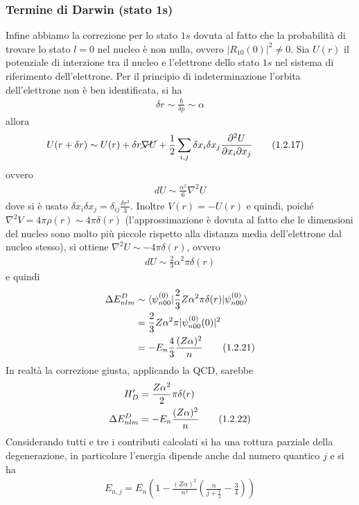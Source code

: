 \documentclass{article}
\begin{document}
\subsubsection*{Termine di Darwin (stato 1s)}
Infine abbiamo la correzione per lo stato $1s$ dovuta al fatto che la probabilità di trovare lo stato $l = 0$ nel nucleo è non nulla, ovvero $|R_{10}(0)|^2 \neq 0$. Sia $U(r)$ il potenziale di interzione tra il nucleo e l'elettrone dello stato $1s$ nel sistema di riferimento dell'elettrone. Per il principio di indeterminazione l'orbita dell'elettrone non è ben identificata, si ha 
\begin{align}
    \delta r \sim \frac{\hbar}{\delta p} \sim \alpha \tag{1.2.16}
\end{align}
allora 
\begin{align}
    U(r + \delta r) &\sim U(r) + \delta r \cancel{\nabla U} + \frac{1}{2}\sum_{i, j}\delta x_i \delta x_j \frac{\partial^2 U}{\partial x_i \partial x_j} \tag{1.2.17}
\end{align}
ovvero 
\begin{align}
    dU \sim \frac{\alpha^2}{6}\nabla^2 U \tag{1.2.18}
\end{align}
dove si è usato $\delta x_i \delta x_j = \delta_{ij}\frac{\delta r^2}{3}$. Inoltre $V(r) = - U(r)$ e quindi, poiché $\nabla^2V = 4\pi\rho(r) \sim 4\pi\delta(r)$ (l'approssimazione è dovuta al fatto che le dimensioni del nucleo sono molto più piccole rispetto alla distanza media dell'elettrone dal nucleo stesso), si ottiene $\nabla^2U \sim -4\pi\delta(r)$, ovvero
\begin{align}
    dU \sim \frac{2}{3}\alpha^2\pi\delta(r) \tag{1.2.20}
\end{align}
e quindi
\begin{align}
    \Delta E^{D}_{nlm} &\sim \braket{\psi^{(0)}_{n00}|\frac{2}{3}Z\alpha^2\pi\delta(r)|\psi^{(0)}_{n00}} \notag \\
    &= \frac{2}{3}Z\alpha^2\pi|\psi^{(0)}_{n00}(0)|^2 \notag \\
    &= -E_n\frac{4}{3}\frac{(Z\alpha)^2}{n} \tag{1.2.21}
\end{align}
In realtà la correzione giusta, applicando la QCD, sarebbe
\begin{align}
    H'_D &= \frac{Z\alpha^2}{2}\pi\delta(r) \notag \\
    \Delta E^D_{nlm} &= -E_n\frac{(Z\alpha)^2}{n} \tag{1.2.22}
\end{align}
Considerando tutti e tre i contributi calcolati si ha una rottura parziale della degenerazione, in particolare l'energia dipende anche dal numero quantico $j$ e si ha 
\begin{align}
    E_{n, j} = E_n\left(1 - \frac{(Z\alpha)^2}{n^2}\left(\frac{n}{j + \frac{1}{2}} - \frac{3}{4}\right)\right) \tag{1.2.23}
\end{align}
\end{document}
